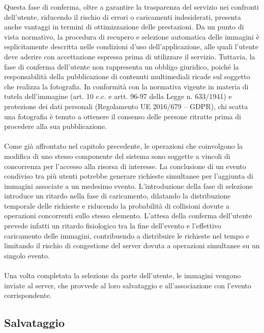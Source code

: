 Questa fase di conferma, oltre a garantire la trasparenza del servizio nei confronti dell’utente, 
riducendo il rischio di errori o caricamenti indesiderati, presenta anche vantaggi in termini di ottimizzazione delle prestazioni. 
\clearpage
Da un punto di vista normativo, la procedura di recupero e selezione automatica delle immagini è esplicitamente descritta nelle condizioni d’uso dell’applicazione, 
alle quali l’utente deve aderire con accettazione espressa prima di utilizzare il servizio. 
Tuttavia, la fase di conferma dell’utente non rappresenta un obbligo giuridico, 
poiché la responsabilità della pubblicazione di contenuti multimediali ricade sul soggetto che realizza la fotografia. 
In conformità con la normativa vigente in materia di tutela dell’immagine (art. 10 c.c. e artt. 96-97 della Legge n. 633/1941) e protezione dei dati personali (Regolamento UE 2016/679 – GDPR), 
chi scatta una fotografia è tenuto a ottenere il consenso delle persone ritratte prima di procedere alla sua pubblicazione.\\
\\
Come già affrontato nel capitolo precedente, le operazioni che coinvolgono la modifica di uno stesso componente del sistema 
sono soggette a vincoli di concorrenza per l’accesso alla risorsa di interesse. 
La conclusione di un evento condiviso tra più utenti potrebbe generare richieste simultanee per l’aggiunta di immagini associate a un medesimo evento. 
L’introduzione della fase di selezione introduce un ritardo nella fase di caricamento, 
dilatando la distribuzione temporale delle richieste e riducendo la probabilità di collisioni dovute a operazioni concorrenti sullo stesso elemento.
L’attesa della conferma dell’utente prevede infatti un ritardo fisiologico tra la fine dell’evento e l’effettivo caricamento delle immagini, 
contribuendo a distribuire le richieste nel tempo e limitando il rischio di congestione del server dovuta a operazioni simultanee su un singolo evento.\\
\\
Una volta completata la selezione da parte dell’utente, le immagini vengono inviate al server, che provvede al loro salvataggio e all’associazione con l’evento corrispondente.


\clearpage

\subsection{Salvataggio}


